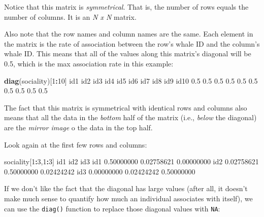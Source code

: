 \documentclass[]{book}
\newenvironment{Shaded}{\begin{snugshade}}{\end{snugshade}}
\newcommand{\DecValTok}[1]{\textcolor[rgb]{0.00,0.00,0.81}{#1}}
\newcommand{\FloatTok}[1]{\textcolor[rgb]{0.00,0.00,0.81}{#1}}
\newcommand{\KeywordTok}[1]{\textcolor[rgb]{0.13,0.29,0.53}{\textbf{#1}}}
\newcommand{\NormalTok}[1]{#1}
\newcommand{\OperatorTok}[1]{\textcolor[rgb]{0.81,0.36,0.00}{\textbf{#1}}}
\begin{document}
Notice that this matrix is \emph{symmetrical}. That is, the number of rows equals the number of columns. It is an \emph{N x N} matrix.

Also note that the row names and column names are the same. Each element in the matrix is the rate of association between the row's whale ID and the column's whale ID. This means that all of the values along this matrix's diagonal will be 0.5, which is the max association rate in this example:

\begin{Shaded}
\begin{Highlighting}[]
\KeywordTok{diag}\NormalTok{(sociality)[}\DecValTok{1}\OperatorTok{:}\DecValTok{10}\NormalTok{]}
\NormalTok{ id1  id2  id3  id4  id5  id6  id7  id8  id9 id10 }
 \FloatTok{0.5}  \FloatTok{0.5}  \FloatTok{0.5}  \FloatTok{0.5}  \FloatTok{0.5}  \FloatTok{0.5}  \FloatTok{0.5}  \FloatTok{0.5}  \FloatTok{0.5}  \FloatTok{0.5} 
\end{Highlighting}
\end{Shaded}

The fact that this matrix is symmetrical with identical rows and columns also means that all the data in the \emph{bottom} half of the matrix (i.e., \emph{below} the diagonal) are the \emph{mirror image} o the data in the top half.

Look again at the first few rows and columns:

\begin{Shaded}
\begin{Highlighting}[]
\NormalTok{sociality[}\DecValTok{1}\OperatorTok{:}\DecValTok{3}\NormalTok{,}\DecValTok{1}\OperatorTok{:}\DecValTok{3}\NormalTok{]}
\NormalTok{           id1        id2        id3}
\NormalTok{id1 }\FloatTok{0.50000000} \FloatTok{0.02758621} \FloatTok{0.00000000}
\NormalTok{id2 }\FloatTok{0.02758621} \FloatTok{0.50000000} \FloatTok{0.02424242}
\NormalTok{id3 }\FloatTok{0.00000000} \FloatTok{0.02424242} \FloatTok{0.50000000}
\end{Highlighting}
\end{Shaded}

If we don't like the fact that the diagonal has large values (after all, it doesn't make much sense to quantify how much an individual associates with itself), we can use the \texttt{diag()} function to replace those diagonal values with \texttt{NA}:
\end{document}
